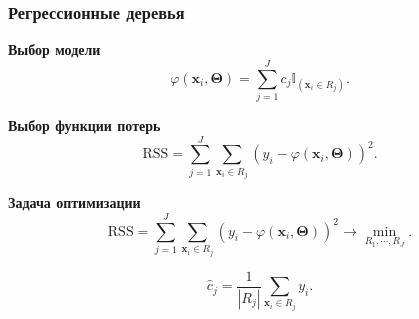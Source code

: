\documentclass[pdf, 9pt, usenames, dvipsnames, unicode, hyperref={bookmarks=true,bookmarksopen=false, bookmarksnumbered}]{beamer}
\begin{document}

\begin{frame}\frametitle{Регрессионные деревья}

\textbf{Выбор модели}
	$$\varphi(\textbf{x}_i, \bm{\Theta}) = \sum\limits_{j=1}^{J} c_j \mathbb{I}_{(\textbf{x}_i \in R_j)}.$$

\textbf{Выбор функции потерь}
	$$\text{RSS} = \sum\limits_{j=1}^{J} \sum\limits_{\textbf{x}_i \in R_j}^{} (y_i - \varphi(\textbf{x}_i, \bm{\Theta}))^2.$$

\textbf{Задача оптимизации}
	$$\text{RSS} = \sum\limits_{j=1}^{J} \sum\limits_{\textbf{x}_i \in R_j}^{} (y_i - \varphi(\textbf{x}_i, \bm{\Theta}))^2 \to \underset{R_1, \cdots, R_J}{\min}.$$
	
	$$\hat{c}_j = \dfrac{1}{|R_j|} \sum\limits_{\textbf{x}_i \in R_j} y_i.$$

\end{frame}

\end{document}
